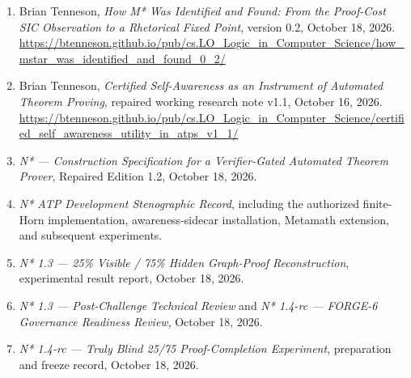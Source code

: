 \documentclass[11pt,letterpaper]{article}
\begin{document}
\begin{enumerate}
\def\labelenumi{\arabic{enumi}.}
\item
  Brian Tenneson, \emph{How M* Was Identified and Found: From the Proof-Cost SIC Observation to a Rhetorical Fixed Point}, version 0.2, October 18, 2026.\\
  \url{https://btenneson.github.io/pub/cs.LO_Logic_in_Computer_Science/how_mstar_was_identified_and_found_0_2/}
\item
  Brian Tenneson, \emph{Certified Self-Awareness as an Instrument of Automated Theorem Proving}, repaired working research note v1.1, October 16, 2026.\\
  \url{https://btenneson.github.io/pub/cs.LO_Logic_in_Computer_Science/certified_self_awareness_utility_in_atps_v1_1/}
\item
  \emph{N* --- Construction Specification for a Verifier-Gated Automated Theorem Prover}, Repaired Edition 1.2, October 18, 2026.
\item
  \emph{N* ATP Development Stenographic Record}, including the authorized finite-Horn implementation, awareness-sidecar installation, Metamath extension, and subsequent experiments.
\item
  \emph{N* 1.3 --- 25\% Visible / 75\% Hidden Graph-Proof Reconstruction}, experimental result report, October 18, 2026.
\item
  \emph{N* 1.3 --- Post-Challenge Technical Review} and \emph{N* 1.4-rc --- FORGE-6 Governance Readiness Review}, October 18, 2026.
\item
  \emph{N* 1.4-rc --- Truly Blind 25/75 Proof-Completion Experiment}, preparation and freeze record, October 18, 2026.
\end{enumerate}
\end{document}
